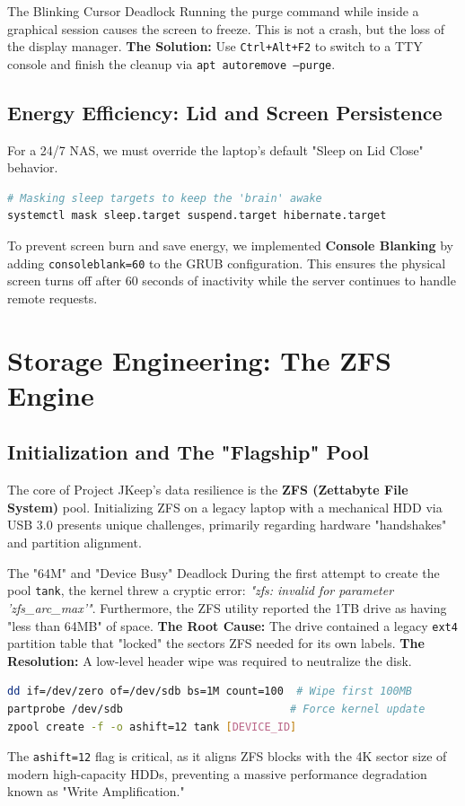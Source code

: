 \documentclass[12pt,a4paper,oneside]{book}
\begin{document}
\begin{techwarning}{The Blinking Cursor Deadlock}
Running the purge command while inside a graphical session causes the screen to freeze. This is not a crash, but the loss of the display manager.
\textbf{The Solution:} Use \texttt{Ctrl+Alt+F2} to switch to a TTY console and finish the cleanup via \texttt{apt autoremove --purge}.
\end{techwarning}

\section{Energy Efficiency: Lid and Screen Persistence}
For a 24/7 NAS, we must override the laptop's default "Sleep on Lid Close" behavior.

\begin{lstlisting}[language=bash]
# Masking sleep targets to keep the 'brain' awake
systemctl mask sleep.target suspend.target hibernate.target
\end{lstlisting}

To prevent screen burn and save energy, we implemented \textbf{Console Blanking} by adding \texttt{consoleblank=60} to the GRUB configuration. This ensures the physical screen turns off after 60 seconds of inactivity while the server continues to handle remote requests.

\chapter{Storage Engineering: The ZFS Engine}

\section{Initialization and The "Flagship" Pool}
The core of Project JKeep's data resilience is the \textbf{ZFS (Zettabyte File System)} pool. Initializing ZFS on a legacy laptop with a mechanical HDD via USB 3.0 presents unique challenges, primarily regarding hardware "handshakes" and partition alignment.

\begin{techwarning}{The "64M" and "Device Busy" Deadlock}
During the first attempt to create the pool \texttt{tank}, the kernel threw a cryptic error: \textit{"zfs: invalid for parameter 'zfs\_arc\_max'"}. Furthermore, the ZFS utility reported the 1TB drive as having "less than 64MB" of space. 
\textbf{The Root Cause:} The drive contained a legacy \texttt{ext4} partition table that "locked" the sectors ZFS needed for its own labels.
\textbf{The Resolution:} A low-level header wipe was required to neutralize the disk.
\begin{lstlisting}[language=bash]
dd if=/dev/zero of=/dev/sdb bs=1M count=100  # Wipe first 100MB
partprobe /dev/sdb                          # Force kernel update
zpool create -f -o ashift=12 tank [DEVICE_ID]
\end{lstlisting}
The \texttt{ashift=12} flag is critical, as it aligns ZFS blocks with the 4K sector size of modern high-capacity HDDs, preventing a massive performance degradation known as "Write Amplification."
\end{techwarning}
\end{document}

